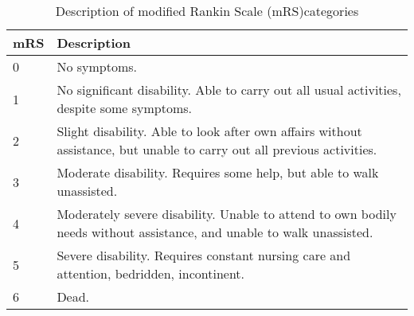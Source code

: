 \begin{minipage}{1.0\textwidth}  %
\begin{longtable}{p{1.2cm} p{13cm}}
\caption{Description of modified Rankin Scale (mRS)categories}\label{tab:mrs}\\
\toprule
mRS & Description \\
\midrule
0 & No symptoms. \\
1 & No significant disability. Able to carry out all usual activities,
despite some symptoms. \\
2 & Slight disability. Able to look after own affairs without
assistance, but unable to carry out all previous activities. \\
3 & Moderate disability. Requires some help, but able to walk
unassisted. \\
4 & Moderately severe disability. Unable to attend to own bodily needs
without assistance, and unable to walk unassisted. \\
5 & Severe disability. Requires constant nursing care and attention,
bedridden, incontinent. \\
6 & Dead. \\
\bottomrule
\end{longtable}
\end{minipage} 


